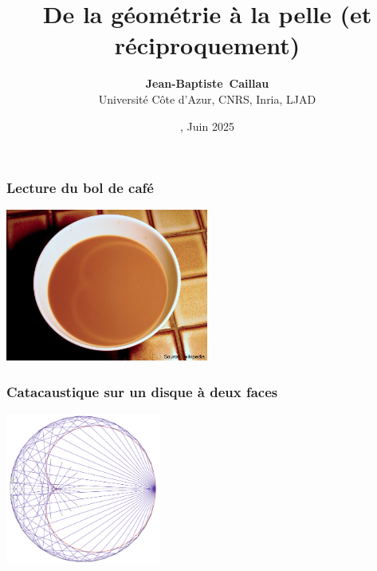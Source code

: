 \documentclass[9pt]{beamer}
\title{\Large \bf De la g\'eom\'etrie \`a la pelle (et r\'eciproquement)}
\author{\textbf{Jean-Baptiste~Caillau}\\
Universit\'e C\^ote d'Azur, CNRS, Inria, LJAD}
\date{\textbf{\emphc{Lyc\'ee Massena}}, Juin 2025}
\begin{document}

\begin{frame}
\frametitle{\bf Lecture du bol de caf\'e}
 
\centering \includegraphics[height=5.0cm]{bol}

\end{frame}

\begin{frame}
\frametitle{\bf Catacaustique sur un disque \`a deux faces}
 
\centering \includegraphics[height=5.0cm]{cata}

\end{frame}
\end{document}
